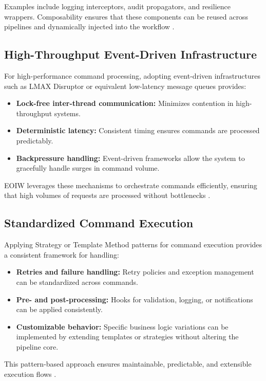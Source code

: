 Examples include logging interceptors, audit propagators, and resilience wrappers. Composability ensures that these components can be reused across pipelines and dynamically injected into the workflow \cite{martinFowlerInterceptor}.

\subsection{High-Throughput Event-Driven Infrastructure}
For high-performance command processing, adopting event-driven infrastructures such as LMAX Disruptor or equivalent low-latency message queues provides:

\begin{itemize}
    \item \textbf{Lock-free inter-thread communication:} Minimizes contention in high-throughput systems.
    \item \textbf{Deterministic latency:} Consistent timing ensures commands are processed predictably.
    \item \textbf{Backpressure handling:} Event-driven frameworks allow the system to gracefully handle surges in command volume.
\end{itemize}

EOIW leverages these mechanisms to orchestrate commands efficiently, ensuring that high volumes of requests are processed without bottlenecks \cite{thompson2011disruptor}.

\subsection{Standardized Command Execution}
Applying Strategy or Template Method patterns for command execution provides a consistent framework for handling:

\begin{itemize}
    \item \textbf{Retries and failure handling:} Retry policies and exception management can be standardized across commands.
    \item \textbf{Pre- and post-processing:} Hooks for validation, logging, or notifications can be applied consistently.
    \item \textbf{Customizable behavior:} Specific business logic variations can be implemented by extending templates or strategies without altering the pipeline core.
\end{itemize}

This pattern-based approach ensures maintainable, predictable, and extensible execution flows \cite{gamma1994design}.

